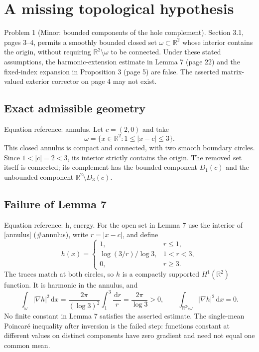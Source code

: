 \documentclass[10pt]{article}
\begin{document}
\section*{A missing topological hypothesis}
Problem 1 (Minor: bounded components of the hole complement).  Section 3.1, pages 3–4, permits a smoothly bounded closed set \(\omega\subset\mathbb R^2\) whose interior contains the origin, without requiring \(\mathbb R^2\setminus\omega\) to be connected. Under these stated assumptions, the harmonic-extension estimate in Lemma 7 (page 22) and the fixed-index expansion in Proposition 3 (page 5) are false. The asserted matrix-valued exterior corrector on page 4 may not exist.\par
\subsection*{Exact admissible geometry}
Equation reference: annulus. Let \(c=(2,0)\) and take \[
 \omega=\{x\in\mathbb R^2:1\leq |x-c|\leq3\}.\] This closed annulus is compact and connected, with two smooth boundary circles. Since \(1<|c|=2<3\), its interior strictly contains the origin. The removed set itself is connected; its complement has the bounded component \(D_1(c)\) and the unbounded component \(\mathbb R^2\setminus\overline{D_3(c)}\).\par
\subsection*{Failure of Lemma 7}
Equation reference: h, energy. For the open set in Lemma 7 use the interior of [annulus] (\#annulus), write \(r=|x-c|\), and define \[
 h(x)=
 \begin{cases}
 1,&r\leq1,\\
 \log(3/r)/\log3,&1<r<3,\\
 0,&r\geq3.
 \end{cases}\] The traces match at both circles, so \(h\) is a compactly supported \(H^1(\mathbb R^2)\) function. It is harmonic in the annulus, and \[
 \int_{\omega}|\nabla h|^2\,\mathrm dx
 =\frac{2\pi}{(\log3)^2}\int_1^3\frac{\,\mathrm dr}{r}
 =\frac{2\pi}{\log3}>0,\qquad
 \int_{\mathbb R^2\setminus\omega}|\nabla h|^2\,\mathrm dx=0.\] No finite constant in Lemma 7 satisfies the asserted estimate. The single-mean Poincaré inequality after inversion is the failed step: functions constant at different values on distinct components have zero gradient and need not equal one common mean.\par
\end{document}
